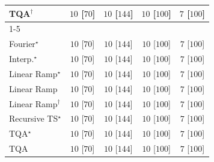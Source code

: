 \begin{tabular}{l|cccc|}
TQA$^\dagger$ & {\cellcolor[HTML]{00441B}} \color[HTML]{F1F1F1} $10$ [$70$] & {\cellcolor[HTML]{00441B}} \color[HTML]{F1F1F1} $10$ [$144$] & {\cellcolor[HTML]{00441B}} \color[HTML]{F1F1F1} $10$ [$100$] & {\cellcolor[HTML]{F7FCF5}} \color[HTML]{000000} $7$ [$100$] \\
\cline{1-5}
\multicolumn{5}{c}{\rule{0pt}{8pt}PP} \\
\midrule
Fourier$^\star$ & {\cellcolor[HTML]{00441B}} \color[HTML]{F1F1F1} $10$ [$70$] & {\cellcolor[HTML]{00441B}} \color[HTML]{F1F1F1} $10$ [$144$] & {\cellcolor[HTML]{00441B}} \color[HTML]{F1F1F1} $10$ [$100$] & {\cellcolor[HTML]{F7FCF5}} \color[HTML]{000000} $7$ [$100$] \\
Interp.$^\star$ & {\cellcolor[HTML]{00441B}} \color[HTML]{F1F1F1} $10$ [$70$] & {\cellcolor[HTML]{00441B}} \color[HTML]{F1F1F1} $10$ [$144$] & {\cellcolor[HTML]{00441B}} \color[HTML]{F1F1F1} $10$ [$100$] & {\cellcolor[HTML]{F7FCF5}} \color[HTML]{000000} $7$ [$100$] \\
Linear Ramp$^\star$ & {\cellcolor[HTML]{00441B}} \color[HTML]{F1F1F1} $10$ [$70$] & {\cellcolor[HTML]{00441B}} \color[HTML]{F1F1F1} $10$ [$144$] & {\cellcolor[HTML]{00441B}} \color[HTML]{F1F1F1} $10$ [$100$] & {\cellcolor[HTML]{F7FCF5}} \color[HTML]{000000} $7$ [$100$] \\
Linear Ramp & {\cellcolor[HTML]{00441B}} \color[HTML]{F1F1F1} $10$ [$70$] & {\cellcolor[HTML]{00441B}} \color[HTML]{F1F1F1} $10$ [$144$] & {\cellcolor[HTML]{00441B}} \color[HTML]{F1F1F1} $10$ [$100$] & {\cellcolor[HTML]{F7FCF5}} \color[HTML]{000000} $7$ [$100$] \\
Linear Ramp$^\dagger$ & {\cellcolor[HTML]{00441B}} \color[HTML]{F1F1F1} $10$ [$70$] & {\cellcolor[HTML]{00441B}} \color[HTML]{F1F1F1} $10$ [$144$] & {\cellcolor[HTML]{00441B}} \color[HTML]{F1F1F1} $10$ [$100$] & {\cellcolor[HTML]{F7FCF5}} \color[HTML]{000000} $7$ [$100$] \\
Recursive TS$^\star$ & {\cellcolor[HTML]{00441B}} \color[HTML]{F1F1F1} $10$ [$70$] & {\cellcolor[HTML]{00441B}} \color[HTML]{F1F1F1} $10$ [$144$] & {\cellcolor[HTML]{00441B}} \color[HTML]{F1F1F1} $10$ [$100$] & {\cellcolor[HTML]{F7FCF5}} \color[HTML]{000000} $7$ [$100$] \\
TQA$^\star$ & {\cellcolor[HTML]{00441B}} \color[HTML]{F1F1F1} $10$ [$70$] & {\cellcolor[HTML]{00441B}} \color[HTML]{F1F1F1} $10$ [$144$] & {\cellcolor[HTML]{00441B}} \color[HTML]{F1F1F1} $10$ [$100$] & {\cellcolor[HTML]{F7FCF5}} \color[HTML]{000000} $7$ [$100$] \\
TQA & {\cellcolor[HTML]{00441B}} \color[HTML]{F1F1F1} $10$ [$70$] & {\cellcolor[HTML]{00441B}} \color[HTML]{F1F1F1} $10$ [$144$] & {\cellcolor[HTML]{00441B}} \color[HTML]{F1F1F1} $10$ [$100$] & {\cellcolor[HTML]{F7FCF5}} \color[HTML]{000000} $7$ [$100$] \\

\end{tabular}
